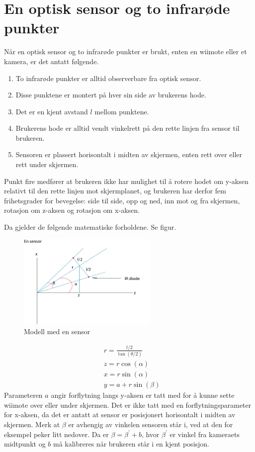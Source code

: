 \documentclass{report}
\begin{document}
\section{En optisk sensor og to infrarøde punkter}
Når en optisk sensor og to infrarøde punkter er brukt, enten en wiimote eller et kamera, er det antatt følgende.
\begin{enumerate}
\item To infrarøde punkter er alltid observerbare fra optisk sensor. 
\item Disse punktene er montert på hver sin side av brukerens hode.
\item Det er en kjent avstand $l$ mellom punktene. 
\item Brukerens hode er alltid vendt vinkelrett på den rette linjen fra sensor til brukeren.
\item Sensoren er plassert horisontalt i midten av skjermen, enten rett over eller rett under skjermen.
\end{enumerate}
Punkt fire medfører at brukeren ikke har mulighet til å rotere hodet om y-aksen relativt til den rette linjen mot skjermplanet, og
brukeren har derfor fem frihetsgrader for bevegelse: side til side, opp og ned, inn mot og fra skjermen, rotasjon om z-aksen og rotasjon om x-aksen.

Da gjelder de følgende matematiske forholdene. Se figur.
	\begin{figure}[h]
	\centering
	\includegraphics[width=0.60\textwidth]{graphics/Figur_en_sensor.jpg}
	\caption{Modell med en sensor}
	\label{fig:En_sensor}
	\end{figure}

\begin{eqnarray}\label{definition}
&r = \frac{l/2}{\tan( \theta/2 )}\\
&z = r \cos( \alpha )\\
&x = r \sin( \alpha )\\
&y = a + r \sin( \beta )
\end{eqnarray}
Parameteren $a$ angir forflytning langs y-aksen er tatt med for å kunne sette wiimote over eller under skjermen.
Det er ikke tatt med en forflytningsparameter for x-aksen, da det er antatt at sensor er posisjonert horisontalt i midten av skjermen.
Merk at $\beta$ er avhengig av vinkelen sensoren står i, ved at den for eksempel peker litt nedover.
Da er $\beta = \beta^\prime + b$, hvor $\beta^\prime$ er vinkel fra kameraets midtpunkt og $b$ må kalibreres når brukeren står i en kjent posisjon.
\end{document}
